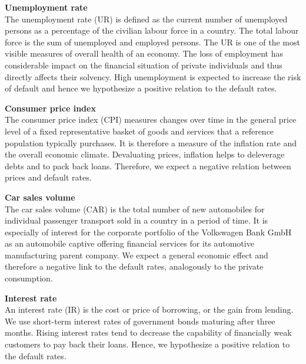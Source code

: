\documentclass[a4paper, 11pt]{scrreprt}
\begin{document}
\bigskip

\textbf{Unemployment rate} \\
The unemployment rate (UR) is defined as the current number of unemployed persons as a percentage of the civilian labour force in a country. The total labour force is the sum of unemployed and employed persons. The UR is one of the most visible measures of overall health of an economy. The loss of employment has considerable impact on the financial situation of private individuals and thus directly affects their solvency. High unemployment is expected to increase the risk of default and hence we hypothesize a positive relation to the default rates.

\bigskip

\textbf{Consumer price index} \\
The consumer price index (CPI) measures changes over time in the general price level of a fixed representative basket of goods and services that a reference population typically purchases. It is therefore a measure of the inflation rate and the overall economic climate. 
Devaluating prices, inflation helps to deleverage debts and to pack back loans. Therefore, we expect a negative relation between prices and default rates.



\textbf{Car sales volume} \\
The car sales volume (CAR) is the total number of new automobiles for individual passenger transport sold in a country in a period of time. It is especially of interest for the corporate portfolio of the Volkswagen Bank GmbH as an automobile captive offering financial services for its automotive manufacturing parent company.
We expect a general economic effect and therefore a negative link to the default rates, analogously to the private consumption.

\bigskip 

\textbf{Interest rate} \\
An interest rate (IR) is the cost or price of borrowing, or the gain from lending. We use short-term interest rates of government bonds maturing after three months. Rising interest rates tend to decrease the capability of financially weak customers to pay back their loans. Hence, we hypothesize a positive relation to the default rates.
\end{document}
